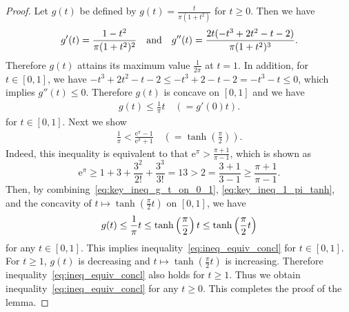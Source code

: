 \documentclass[pdflatex,sn-mathphys-num]{sn-jnl}%
\theoremstyle{thmstyleone}%
\theoremstyle{thmstyletwo}%
\theoremstyle{thmstylethree}%
\begin{document}
\begin{appendices}
\begin{proof}
Let $g(t)$ be defined by $g(t) = \frac{t}{\pi (1+t^{2})}$ for $t \geq 0$. 
Then we have
\begin{align}
g'(t) = \frac{1-t^{2}}{\pi(1+t^{2})^{2}}
\quad \text{and} \quad
g''(t) = \frac{2t(-t^{3} + 2t^{2} - t -2)}{\pi(1+t^{2})^{3}}.
\notag
\end{align}
Therefore $g(t)$ attains its maximum value $\frac{1}{2\pi}$ at $t = 1$. 
In addition, 
for $t \in [0, 1]$, 
we have $-t^{3} + 2t^{2} - t -2 \leq -t^{3} + 2 - t - 2 = -t^{3} - t \leq 0$, 
which implies $g''(t) \leq 0$. 
Therefore $g(t)$ is concave on $[0,1]$ and we have
\begin{align}
g(t) \leq \frac{1}{\pi} t \quad (=g'(0)t).
\label{eq:key_ineq_g_t_on_0_1}
\end{align}
for $t \in [0,1]$. 
Next we show 
\begin{align}
\frac{1}{\pi} < \frac{\mathrm{e}^{\pi} - 1}{\mathrm{e}^{\pi} + 1}
\quad 
\left( = \tanh \left( \frac{\pi}{2} \right) \right).
\label{eq:key_ineq_1_pi_tanh}
\end{align}
Indeed, this inequality is equivalent to that 
\(
\mathrm{e}^{\pi} > \frac{\pi + 1}{\pi-1}
\), which is shown as
\[
\mathrm{e}^{\pi}
\geq 1 + 3 + \frac{3^2}{2!} + \frac{3^3}{3!}
= 13 > 2 = 
\frac{3+1}{3-1}
\geq 
\frac{\pi + 1}{\pi-1}. 
\]
Then, 
by combining~\eqref{eq:key_ineq_g_t_on_0_1}, \eqref{eq:key_ineq_1_pi_tanh}, 
and the concavity of $t \mapsto \tanh(\frac{\pi}{2}t)$ on $[0,1]$, 
we have
\begin{align}
g(t) \leq \frac{1}{\pi} t \leq \tanh \left( \frac{\pi}{2} \right) t \leq \tanh \left( \frac{\pi}{2} t \right)
\notag
\end{align}
for any $t \in [0,1]$. 
This implies inequality~\eqref{eq:ineq_equiv_concl} for $t \in [0,1]$.
For $t \geq 1$, $g(t)$ is decreasing and $t \mapsto \tanh(\frac{\pi}{2}t)$ is increasing. 
Therefore inequality~\eqref{eq:ineq_equiv_concl} also holds for  $t \geq 1$. 
Thus we obtain inequality~\eqref{eq:ineq_equiv_concl} for  any $t \geq 0$.
This completes the proof of the lemma.
\end{proof}




\end{appendices}
\end{document}
